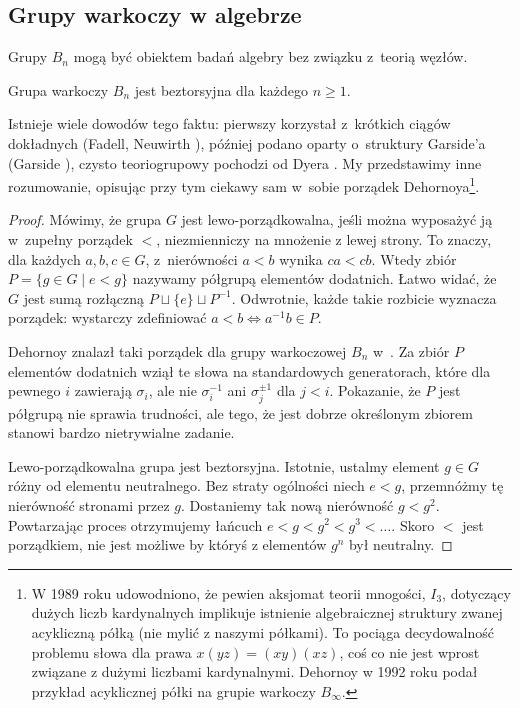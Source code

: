 
\subsection{Grupy warkoczy w algebrze}
Grupy $B_n$ mogą być obiektem badań algebry bez związku z~teorią węzłów.

\begin{proposition}
    Grupa warkoczy $B_n$ jest beztorsyjna dla każdego $n \ge 1$.
\end{proposition}

Istnieje wiele dowodów tego faktu: pierwszy korzystał z~krótkich ciągów dokładnych (Fadell, Neuwirth \cite{neuwirth62}), później podano oparty o~struktury Garside'a (Garside \cite{garside69}), czysto teoriogrupowy pochodzi od Dyera \cite{dyer80}.
%
%
%
%
My przedstawimy inne rozumowanie, opisując przy tym ciekawy sam w~sobie porządek Dehornoya\footnote{W 1989 roku udowodniono, że pewien aksjomat teorii mnogości, $I_3$, dotyczący dużych liczb kardynalnych implikuje istnienie algebraicznej struktury zwanej acykliczną półką (nie mylić z naszymi półkami).
To pociąga decydowalność problemu słowa dla prawa $x(yz) = (xy)(xz)$, coś co nie jest wprost związane z dużymi liczbami kardynalnymi.
Dehornoy w 1992 roku podał przykład acyklicznej półki na grupie warkoczy $B_\infty$.}.%
%

\begin{proof}
%
    Mówimy, że grupa $G$ jest lewo-porządkowalna, jeśli można wyposażyć ją w~zupełny porządek $<$, niezmienniczy na mnożenie z lewej strony.
    To znaczy, dla każdych $a, b, c \in G$, z~nierówności $a < b$ wynika $ca < cb$.
    Wtedy zbiór $P = \{g \in G \mid e < g\}$ nazywamy półgrupą elementów dodatnich.
    Łatwo widać, że $G$ jest sumą rozłączną $P \sqcup \{e\} \sqcup P^{-1}$.
    Odwrotnie, każde takie rozbicie wyznacza porządek: wystarczy zdefiniować $a < b \iff a^{-1}b \in P$.

    Dehornoy znalazł taki porządek dla grupy warkoczowej $B_n$ w~\cite{dehornoy94}.
    Za zbiór $P$ elementów dodatnich wziął te słowa na standardowych generatorach, które dla pewnego $i$ zawierają $\sigma_i$, ale nie $\sigma_i^{-1}$ ani $\sigma_j^{\pm 1}$ dla $j < i$.
    Pokazanie, że $P$ jest półgrupą nie sprawia trudności, ale tego, że jest dobrze określonym zbiorem stanowi bardzo nietrywialne zadanie.

    Lewo-porządkowalna grupa jest beztorsyjna.
    Istotnie, ustalmy element $g \in G$ różny od elementu neutralnego.
    Bez straty ogólności niech $e < g$, przemnóżmy tę nierówność stronami przez $g$.
    Dostaniemy tak nową nierówność $g < g^2$.
    Powtarzając proces otrzymujemy łańcuch $e < g < g^2 < g^3 < \ldots$.
    Skoro $<$ jest porządkiem, nie jest możliwe by któryś z elementów $g^n$ był neutralny.
\end{proof}

